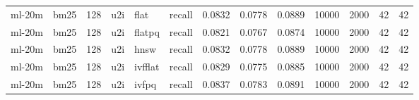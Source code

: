 \begin{tabular}{llrlllrrrrrrr}
ml-20m & bm25 & 128 & u2i & flat & recall & 0.0832 & 0.0778 & 0.0889 & 10000 & 2000 & 42 & 42 \\
ml-20m & bm25 & 128 & u2i & flatpq & recall & 0.0821 & 0.0767 & 0.0874 & 10000 & 2000 & 42 & 42 \\
ml-20m & bm25 & 128 & u2i & hnsw & recall & 0.0832 & 0.0778 & 0.0889 & 10000 & 2000 & 42 & 42 \\
ml-20m & bm25 & 128 & u2i & ivfflat & recall & 0.0829 & 0.0775 & 0.0885 & 10000 & 2000 & 42 & 42 \\
ml-20m & bm25 & 128 & u2i & ivfpq & recall & 0.0837 & 0.0783 & 0.0891 & 10000 & 2000 & 42 & 42 \\
\bottomrule
\end{tabular}
